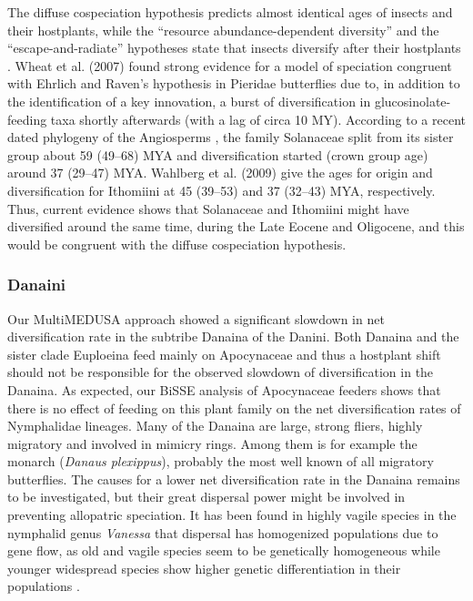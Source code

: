 \documentclass[10pt]{article}
\begin{document}
The diffuse cospeciation hypothesis predicts almost identical ages of
insects and their hostplants, while the ``resource abundance-dependent
diversity'' and the ``escape-and-radiate'' hypotheses state that insects
diversify after their hostplants \cite{nyman2012, ehrlich1964, janz2011}.
Wheat et al. (2007)
\cite{wheat2007} found strong evidence for a model of speciation congruent with
Ehrlich and Raven's hypothesis in Pieridae butterflies due to, in
addition to the identification of a key innovation, a burst of
diversification in glucosinolate-feeding taxa shortly afterwards (with a
lag of circa 10 MY). According to a recent dated phylogeny of the
Angiosperms \cite{bell2010}, the family Solanaceae split from its sister group
about 59 (49--68) MYA and diversification started (crown group age)
around 37 (29--47) MYA. Wahlberg et al. (2009) \cite{wahlberg2009} give the ages
for origin and diversification for Ithomiini at 45 (39--53) and 37
(32--43) MYA, respectively. Thus, current evidence shows that Solanaceae
and Ithomiini might have diversified around the same time, during the
Late Eocene and Oligocene, and this would be congruent with the diffuse
cospeciation hypothesis.

\subsubsection*{Danaini}
Our MultiMEDUSA approach showed a significant slowdown in net
diversification rate in the subtribe Danaina of the Danini. Both Danaina
and the sister clade Euploeina feed mainly on Apocynaceae and thus a
hostplant shift should not be responsible for the observed slowdown of
diversification in the Danaina. As expected, our BiSSE analysis of
Apocynaceae feeders shows that there is no effect of feeding on this
plant family on the net diversification rates of Nymphalidae lineages.
Many of the Danaina are large, strong fliers, highly migratory and
involved in mimicry rings. Among them is for example the monarch
(\emph{Danaus plexippus}), probably the most well known of all migratory
butterflies. The causes for a lower net diversification rate in the
Danaina remains to be investigated, but their great dispersal power
might be involved in preventing allopatric speciation. It has been found
in highly vagile species in the nymphalid genus \emph{Vanessa} that
dispersal has homogenized populations due to gene flow, as old and
vagile species seem to be genetically homogeneous while younger
widespread species show higher genetic differentiation in their
populations \cite{wahlberg2011}.
\end{document}
